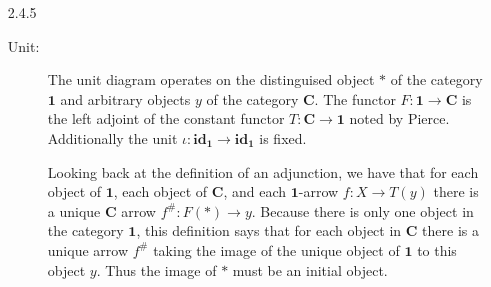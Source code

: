 \documentclass{article}
\newcommand{\one}{\mathbf{1}}
\newcommand{\cat}{\mathbf{C}}
\newcommand{\id}{\mathbf{id}}
\begin{document}
\begin{enumerate}
\item [2.4.5]
  \begin{description}
  \item [Unit:]
    The unit diagram operates on the distinguised object $*$ of the category $\one$ and arbitrary objects $y$ of the category $\cat$.
    The functor $F : \one \rightarrow \cat$ is the left adjoint of the constant functor $T : \cat \rightarrow \one$ noted by Pierce.
    Additionally the unit $\iota : \id_\one \rightarrow \id_\one$ is fixed.
    \begin{center}
    \end{center}
    Looking back at the definition of an adjunction, we have that for each object of $\one$, each object of $\cat$, and each $\one$-arrow $f: X \rightarrow T(y)$ there is a unique $\cat$ arrow $f^{\#} : F(*) \rightarrow y$.
    Because there is only one object in the category $\one$, this definition says that for each object in $\cat$ there is a unique arrow $f^{\#}$ taking the image of the unique object of $\one$ to this object $y$.
    Thus the image of $*$ must be an initial object.


\end{description}
\end{enumerate}
\end{document}
